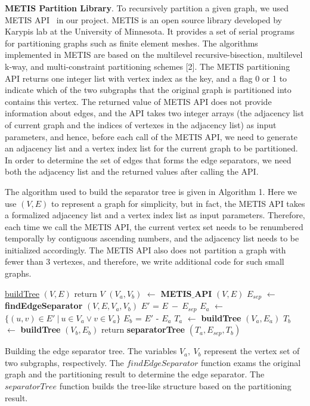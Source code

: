 \documentclass[12pt,glossary]{dalthesis}
\begin{document}
\bigskip
\bigskip

\textbf{METIS Partition Library}. To recursively partition a given graph, we used METIS API~\cite{metis-lib} in our project. METIS is an open source library developed by Karypis lab at the University of Minnesota. It provides a set of serial programs for partitioning graphs such as finite element meshes. The algorithms implemented in METIS are based on the multilevel recursive-bisection, multilevel k-way, and multi-constraint partitioning schemes [2]. The METIS partitioning API returns one integer list with vertex index as the key, and a flag 0 or 1 to indicate which of the two subgraphs that the original graph is partitioned into contains this vertex. The returned value of METIS API does not provide information about edges, and the API takes two integer arrays (the adjacency list of current graph and the indices of vertexes in the adjacency list) as input parameters, and hence, before each call of the METIS API, we need to generate an adjacency list and a vertex index list for the current graph to be partitioned. In order to determine the set of edges that forms the edge separators, we need both the adjacency list and the returned values after calling the API.

\bigskip
\bigskip

The algorithm used to build the separator tree is given in Algorithm 1. Here we use $(V,E)$
to represent a graph for simplicity, but in fact, the METIS API takes a formalized adjacency list and a vertex index list as input parameters. Therefore, each time we call the METIS API, the current vertex set needs to be renumbered temporally by contiguous ascending numbers, and the adjacency list needs to be initialized accordingly. The METIS API also does not partition a graph with fewer than 3 vertexes, and therefore, we write additional code for such small graphs.

\bigskip

\begin{algorithm}
    \underline{buildTree} $(V,E)$\;
      {
        return $V$\;
      }
      {
      	$(V_{a},V_{b})$ $\leftarrow$ \textbf{METIS$\_$API} $(V,E)$  \;
		$E_{sep}$ $\leftarrow$ \textbf{findEdgeSeparator} $(V,E,V_{a},V_{b})$ \;
		$E'$ = $E \  - \ E_{sep}$   \;
      	$E_{a}$ $\leftarrow$ $\{ (u,v) \in E' \ | \  u\in V_{a} \vee v \in V_{a} \}$ \;
		$E_{b}$ = $E'$ - $E_{a}$ \;
		$T_{a}$ $\leftarrow$ \textbf{buildTree} $(V_{a},E_{a})$ \;
		$T_{b}$ $\leftarrow$ \textbf{buildTree} $(V_{b},E_{b})$ \;  
        return \textbf{separatorTree} $(T_{a}, E_{sep}, T_{b})$ \; 
      }
    \caption{Building the edge separator tree. The variables $V_{a},\ V_{b}$ represent the vertex set of two subgraphs, respectively. The $findEdgeSeparator$ function exams the original graph and the partitioning result to determine the edge separator. The $separatorTree$ function builds the tree-like structure based on the partitioning result.}
\end{algorithm}
\bigskip
\end{document}
